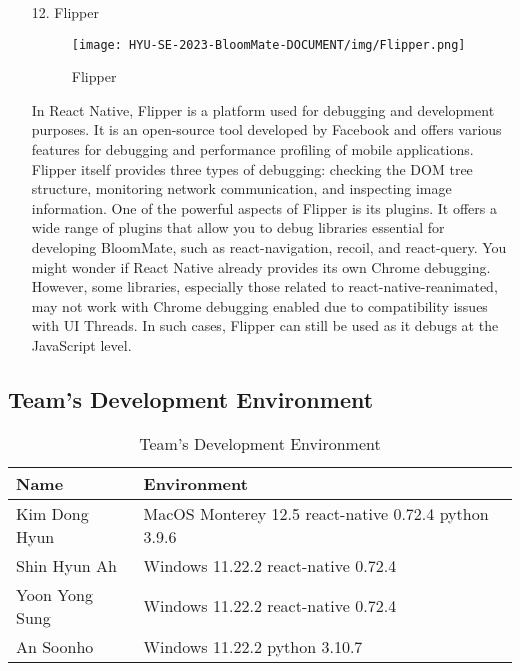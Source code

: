 \documentclass[conference, a4paper]{IEEEtran}
\begin{document}
\begin{enumerate}
    \item[12.]Flipper
    \begin{figure}[h]
    \centering
    \texttt{[image: HYU-SE-2023-BloomMate-DOCUMENT/img/Flipper.png]}
    \label{fig:Flipper}
    \caption{Flipper} 
    \end{figure}
    \item[]In React Native, Flipper is a platform used for debugging and development purposes. It is an open-source tool developed by Facebook and offers various features for debugging and performance profiling of mobile applications. Flipper itself provides three types of debugging: checking the DOM tree structure, monitoring network communication, and inspecting image information. One of the powerful aspects of Flipper is its plugins. It offers a wide range of plugins that allow you to debug libraries essential for developing BloomMate, such as react-navigation, recoil, and react-query. You might wonder if React Native already provides its own Chrome debugging. However, some libraries, especially those related to react-native-reanimated, may not work with Chrome debugging enabled due to compatibility issues with UI Threads. In such cases, Flipper can still be used as it debugs at the JavaScript level.\\
\end{enumerate}
\subsection{Team's Development Environment}
 \begin{table}[htp]
 \caption{Team's Development Environment}
 \centering
 \setlength{\tabcolsep}{12pt}
\renewcommand{\arraystretch}{1.3}
 \begin{tabular}{| p{3cm}|p{4cm} |}
 \hline
 Name & Environment \\ 
 \hline
Kim Dong Hyun & {MacOS Monterey 12.5 \newline react-native 0.72.4 \newline python 3.9.6} \\
 \hline
 Shin Hyun Ah & {Windows 11.22.2 \newline react-native 0.72.4} \\ 
 \hline
 Yoon Yong Sung &{Windows 11.22.2 \newline react-native 0.72.4} \\ 
 \hline
 An Soonho & {Windows 11.22.2 \newline python 3.10.7}\\ 
 \hline
 \end{tabular}
 \end{table}
 
\end{document}
